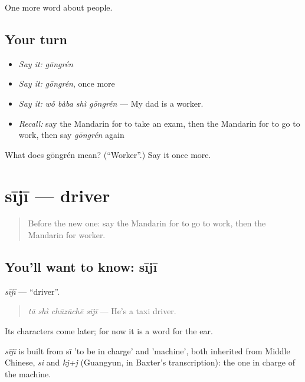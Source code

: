 \begin{grammarlens}[title={What you've built}]
One more word about people.
\end{grammarlens}

\subsection*{Your turn}
\begin{itemize}
\raggedright
  \item \emph{Say it:} \emph{gōngrén}
  \item \emph{Say it:} \emph{gōngrén}, once more
  \item \emph{Say it:} \emph{wǒ bàba shì gōngrén} — My dad is a worker.
  \item \emph{Recall:} say the Mandarin for to take an exam, then the Mandarin for to go to work, then say \emph{gōngrén} again
\end{itemize}

\begin{tcolorbox}[breakable,colback=teal!4,colframe=teal!35!black,title={Before you move on}]
What does gōngrén mean? (\textquotedblleft{}Worker\textquotedblright{}.) Say it once more.
\end{tcolorbox}
\section[sījī]{sījī — driver}

\label{lesson:ZH-C80-siji}



\begin{quote}
Before the new one: say the Mandarin for to go to work, then the Mandarin for worker.
\end{quote}

\subsection*{You'll want to know: sījī}
\emph{sījī} — \textquotedblleft{}driver\textquotedblright{}.

\begin{quote}
\emph{tā shì chūzūchē sījī} — He's a taxi driver.
\end{quote}

Its characters come later; for now it is a word for the ear.

\begin{cousinweb}
\emph{sījī} is built from sī 'to be in charge' and  'machine', both inherited from Middle Chinese, \emph{si} and \emph{kj+j} (Guangyun, in Baxter's transcription): the one in charge of the machine.
\end{cousinweb}

